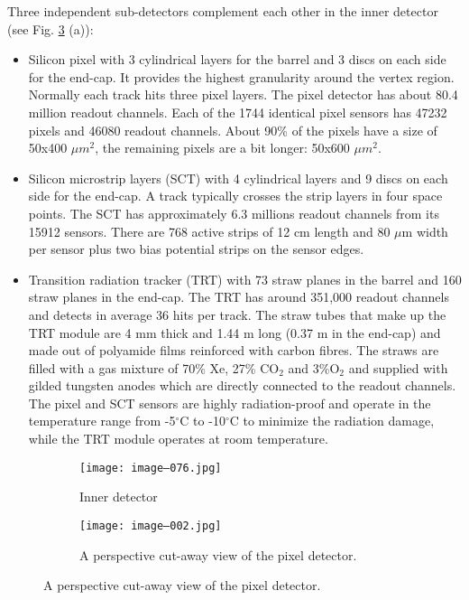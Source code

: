 		Three independent sub-detectors complement each other in the inner detector (see Fig. \ref{fig::cfrs} (a)):
		\begin{itemize}
		\item Silicon pixel with 3 cylindrical layers for the barrel and 3 discs on each side for the end-cap. It provides the highest granularity around the vertex region. Normally each track hits three pixel layers. The pixel detector has about 80.4 million readout channels. Each of the 1744 identical pixel sensors has 47232 pixels and 46080 readout channels. About 90\% of the pixels have a size of 50x400 $\mu m^2$, the remaining pixels are a bit longer: 50x600 $\mu m^2$.
		\item Silicon microstrip layers (SCT) with 4 cylindrical layers and 9 discs on each side for the end-cap. A track typically crosses the strip layers in four space points. The SCT has approximately 6.3 millions readout channels from its 15912 sensors. There are 768 active strips of 12 cm length and 80 $\mu$m width per sensor plus two bias potential strips on the sensor edges.
		\item Transition radiation tracker (TRT) with 73 straw planes in the barrel and 160 straw planes in the end-cap. The TRT has around 351,000 readout channels and detects in average 36 hits per track. The straw tubes that make up the TRT module are 4 mm thick and 1.44 m long (0.37 m in the end-cap) and made out of polyamide films reinforced with carbon fibres. The straws are filled with a gas mixture of 70\% Xe, 27\% CO$_2$ and 3\%O$_2$ and supplied with gilded tungsten anodes which are directly connected to the readout channels.
		The pixel and SCT sensors are highly radiation-proof and operate in the temperature range from -5$^\circ$C to -10$^\circ$C to minimize the radiation damage, while the TRT module operates at room temperature.	
		\end{itemize}
		\begin{figure}[htbp]
			\begin{subfigure}[t]{0.48\textwidth}
				\texttt{[image: image--076.jpg]}
				\caption[Inner detector]{Inner detector}
				\label{fig::id}
			\end{subfigure}
		                \hfill
			\begin{subfigure}[t]{0.48\textwidth}
				\texttt{[image: image--002.jpg]}
				\caption[Pixel detector]{A perspective cut-away view of the pixel detector.}
				\label{fig::pd}
			\end{subfigure}
			\label{fig::cfrs}
		\end{figure}
